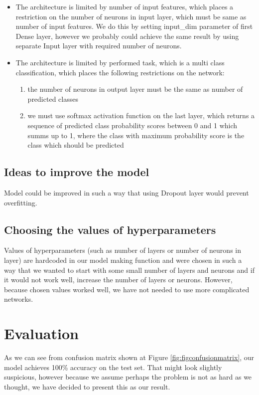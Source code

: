 \documentclass[12pt,a4paper]{article}
\begin{document}
\begin{itemize}
\item The architecture is limited by number of input features, which places a restriction on the number of neurons in input layer, which must be same as number of input features. We do this by setting input\_dim parameter of first Dense layer, however we probably could achieve the same result by using separate Input layer with required number of neurons.
\item The architecture is limited by performed task, which is a multi class classification, which places the following restrictions on the network:

\begin{enumerate}
	\item the number of neurons in output layer must be the same as number of predicted classes
	\item we must use softmax activation function on the last layer, which returns a sequence of predicted class probability scores between 0 and 1 which summs up to 1, where the class with maximum probability score is the class which should be predicted
\end{enumerate}
\end{itemize}

\subsection{Ideas to improve the model}

Model could be improved in such a way that using Dropout layer would prevent overfitting.

\subsection{Choosing the values of hyperparameters}

Values of hyperparameters (such as number of layers or number of neurons in layer) are hardcoded in our model making function and were chosen in such a way that we wanted to start with some small number of layers and neurons and if it would not work well, increase the number of layers or neurons. However, because chosen values worked well, we have not needed to use more complicated networks.

\section{Evaluation}

As we can see from confusion matrix shown at Figure \ref{fig:figconfusionmatrix},
our model achieves 100\% accuracy on the test set. That might look slightly suspicious,
however because we assume perhaps the problem is not as hard as we thought,
we have decided to present this as our result.
\end{document}
